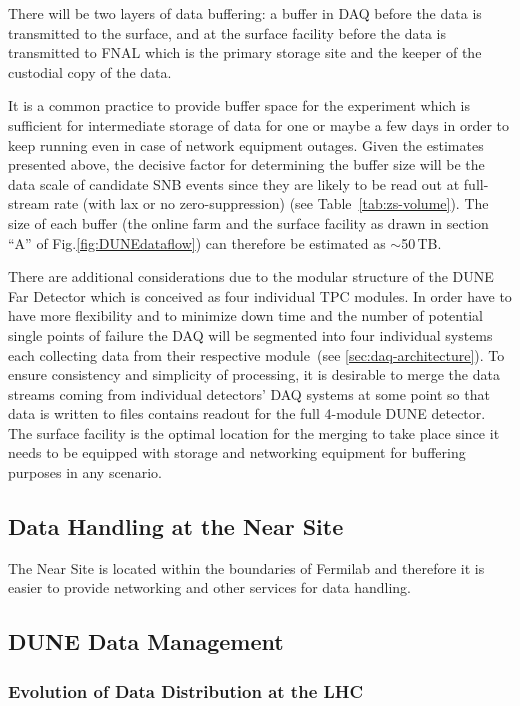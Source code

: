 There will be two layers of data buffering: a buffer in DAQ before the data is transmitted to the surface,
and at the surface facility before the data is transmitted to FNAL which is the primary storage site and the
keeper of the custodial copy of the data.

It is a common practice to provide buffer space for the experiment which is sufficient for intermediate storage of data
for one or maybe a few days in order to keep running even in case of network equipment outages. Given the estimates
presented above, the decisive factor for determining the buffer size will be the data scale of candidate SNB events since
they are likely to be read out at full-stream rate (with lax or no zero-suppression) (see Table~\ref{tab:zs-volume}). The
size of each buffer (the online farm and the surface facility as drawn in section ``A'' of Fig.\ref{fig:DUNEdataflow})
can therefore be estimated as $\sim$50\,TB.

There are additional considerations due to the modular structure of the DUNE Far Detector
which is conceived as four individual TPC modules. In order have to have more flexibility and to minimize down time
and the number of potential single points of failure the DAQ will be segmented into four individual  systems each collecting
data from their respective module~(see \ref{sec:daq-architecture}). To ensure
consistency and simplicity of processing, it is desirable to merge the data streams coming from individual
detectors' DAQ systems at some point so that data is written to files contains readout for the full 4-module
DUNE detector. The surface facility is the optimal location for the merging to take place since it needs to be
equipped with storage and networking equipment for buffering purposes in any scenario.

\subsection{Data Handling at the Near Site}
The Near Site is located within the boundaries of Fermilab and therefore it is easier to provide networking and other services for data handling.

\subsection{DUNE Data Management}
\subsubsection{Evolution of Data Distribution at the LHC}

